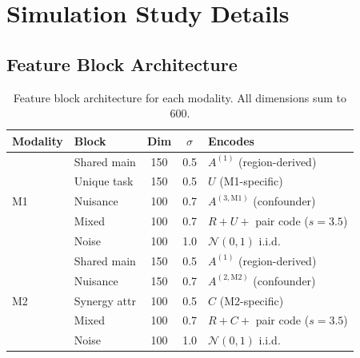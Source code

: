 \documentclass{article}
\theoremstyle{plain}
\theoremstyle{definition}
\begin{document}
\section{Simulation Study Details}\label{app:sim-design}

\subsection{Feature Block Architecture}\label{app:feature-blocks}

\begin{table}[!ht]
\centering
\caption{Feature block architecture for each modality. All dimensions sum to 600.}
\label{tab:feature-blocks}
\small
\begin{tabular}{llccl}
\toprule
Modality & Block & Dim & $\sigma$ & Encodes \\
\midrule
\multirow{5}{*}{M1}
 & Shared main     & 150 & 0.5 & $A^{(1)}$ (region-derived) \\
 & Unique task      & 150 & 0.5 & $U$ (M1-specific) \\
 & Nuisance         & 100 & 0.7 & $A^{(3,\text{M1})}$ (confounder) \\
 & Mixed            & 100 & 0.7 & $R + U +$ pair code ($s{=}3.5$) \\
 & Noise            & 100 & 1.0 & $\mathcal{N}(0,1)$ i.i.d. \\
\midrule
\multirow{5}{*}{M2}
 & Shared main     & 150 & 0.5 & $A^{(1)}$ (region-derived) \\
 & Nuisance         & 150 & 0.7 & $A^{(2,\text{M2})}$ (confounder) \\
 & Synergy attr     & 100 & 0.5 & $C$ (M2-specific) \\
 & Mixed            & 100 & 0.7 & $R + C +$ pair code ($s{=}3.5$) \\
 & Noise            & 100 & 1.0 & $\mathcal{N}(0,1)$ i.i.d. \\
\bottomrule
\end{tabular}
\end{table}
\end{document}
